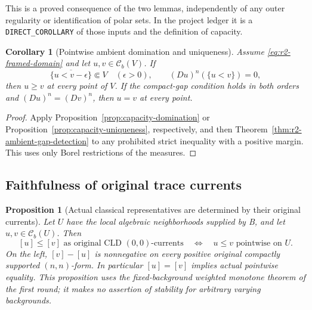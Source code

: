 \documentclass[11pt,a4paper]{article}
\numberwithin{equation}{section}
\newtheorem{proposition}[theorem]{Proposition}
\newtheorem{corollary}[theorem]{Corollary}
\theoremstyle{definition}
\theoremstyle{remark}
\newcommand{\Cb}{\mathcal C_b}
\begin{document}
This is a proved consequence of the two lemmas, independently of any
outer regularity or identification of polar sets. In the project
ledger it is a \texttt{DIRECT\_COROLLARY} of those inputs and the
definition of capacity.

\begin{corollary}[Pointwise ambient domination and uniqueness]
\label{cor:r2-pointwise-ambient}
Assume \eqref{eq:r2-framed-domain} and let $u,v\in\Cb(V)$. If
\[
 \overline{\{u<v-\epsilon\}}\Subset V\quad(\epsilon>0),
 \qquad (Du)^n(\{u<v\})=0,
\]
then $u\geq v$ at every point of $V$. If the compact-gap condition
holds in both orders and $(Du)^n=(Dv)^n$, then $u=v$ at every point.
\end{corollary}

\begin{proof}
Apply Proposition~\ref{prop:capacity-domination} or
Proposition~\ref{prop:capacity-uniqueness}, respectively, and then
Theorem~\ref{thm:r2-ambient-gap-detection} to any prohibited strict
inequality with a positive margin. This uses only Borel restrictions
of the measures.
\end{proof}

\subsection{Faithfulness of original trace currents}

\begin{proposition}[Actual classical representatives are determined by
their original currents]
\label{prop:r2-current-faithfulness}
Let $U$ have the local algebraic neighborhoods supplied by \textup{B},
and let $u,v\in\Cb(U)$. Then
\[
 [u]\leq[v]\text{ as original CLD }(0,0)\text{-currents}
 \quad\Longleftrightarrow\quad u\leq v\text{ pointwise on }U.
\]
On the left, $[v]-[u]$ is nonnegative on every positive original
compactly supported $(n,n)$-form. In particular $[u]=[v]$ implies
actual pointwise equality. This proposition uses the fixed-background
weighted monotone theorem of the first round; it makes no assertion
of stability for arbitrary varying backgrounds.
\end{proposition}
\end{document}
